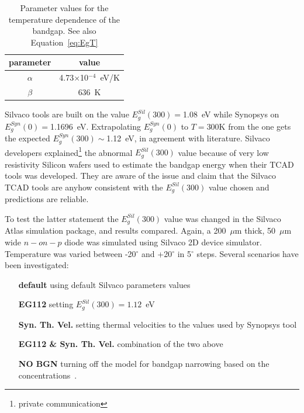 \begin{table}[!htbp]
\caption{\label{eq:Egalphabeta}Parameter values for the temperature dependence of the bandgap. 
See also Equation~\ref{eq:EgT}}
\centering
\begin{tabular}{cc}
\hline
parameter & value \\
\hline 
\hline
$\alpha$ & 4.73$\times$10$^{-4}$~eV/K \\
\hline 
$\beta$ & 636~K \\
\hline
\end{tabular}
\end{table}

\noindent Silvaco tools are built on the value $E^{Sil}_g(300)=$1.08~eV while Synopsys on $E^{Syn}_g(0)=$1.1696~eV. 
Extrapolating $E_g^{Syn}(0)$ to $T=$300K from the one gets the expected 
$E_g^{Syn}(300)\sim$1.12~eV, in agreement with literature.
\noindent Silvaco developers explained\footnote{private communication} the abnormal $E^{Sil}_g(300)$ value 
because of very low resistivity 
Silicon wafers used to estimate the bandgap energy when their TCAD tools was developed. 
They are aware of the issue and claim that the Silvaco TCAD tools are anyhow consistent with 
the $E^{Sil}_g(300)$ value chosen and predictions are reliable.  

To test the latter statement the $E^{Sil}_g(300)$ value was changed in the Silvaco Atlas simulation package, 
and results compared. 
Again, a 200~$\mu$m thick, 50~$\mu$m wide $n-on-p$ diode was simulated using Silvaco 2D device 
simulator. Temperature was varied between -20$^{\circ}$ and +20$^{\circ}$ in 5$^{\circ}$ steps. 
Several scenarios have been investigated:

\begin{center}
\begin{varwidth}{\textwidth}
\begin{itemize}
\item[\bf default] using default Silvaco parameters values
\item[\bf EG112] setting $E^{Sil}_g(300)=1.12$~eV
\item[\bf Syn. Th. Vel.] setting thermal velocities to the values used by Synopsys tool
\item[\bf EG112 \& Syn. Th. Vel.] combination of the two above 
\item[\bf NO BGN] turning off the model for bandgap narrowing based on the concentrations~\cite{SLOTBOOM1977279}.
\end{itemize}
\end{varwidth}
\end{center}

